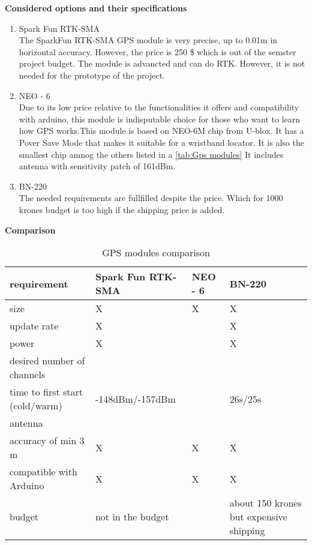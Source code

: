 \textbf{Considered options and their specifications}
\begin{enumerate}
    \item Spark Fun RTK-SMA\\
    The SparkFun RTK-SMA GPS module is very precise, up to 0.01m in horizontal accuracy. However,
    the price is 250 \$ which is out of the semster project budget. The module is advancted and can do RTK. 
    However, it is not needed for the prototype of the project.

       
    \item NEO - 6\\
    Due to its low price relative to the functionalities it offers and compatibility with arduino, 
    this module is indisputable choice for those who want to learn how GPS works.This module is based on NEO-6M chip from U-blox. 
    It has a Pover Save Mode that makes it suitable for a wristband locator. It is also the smallest chip amnog the others listed in a  \autoref{tab:Gps modules}
    It includes antenna with sensitivity patch of 161dBm.
    \item BN-220\\
    The needed requirements are fullfilled despite the price. Which for 1000 krones budget is too high if the shipping price is added.
\cite{1}
\end{enumerate}
\textbf{Comparison}
\begin{center}
    \begin{table}[H]
    \begin{tabularx}{0.8\textwidth}{
    | >{\centering\arraybackslash}X 
    | >{\centering\arraybackslash}X 
    | >{\centering\arraybackslash}X  
    | >{\centering\arraybackslash}X | }

    \hline
    requirement&Spark Fun RTK-SMA&NEO - 6&BN-220 \\
    \hline
    size&X&X&X\\
    \hline
    update rate&X&&X\\
    \hline
    power&X&&X\\
    \hline
    desired number of channels&&&72\\
    \hline
    time to first start (cold/warm)&-148dBm/-157dBm&&26s/25s\\
    \hline
    antenna&&&\\
    \hline
    accuracy of min 3 m&X&X&X\\
    \hline
    compatible with Arduino&X&X&X\\
    \hline
    budget&not in the budget&&about 150 krones but expensive shipping\\
    \hline
\end{tabularx}
 \caption{GPS modules comparison }
        \label{tab:Gps modules}
\end{table}
\end{center}

